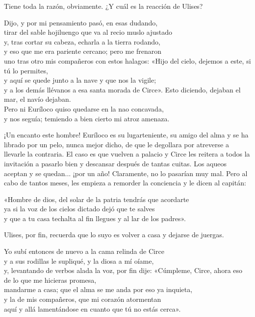 Tiene toda la razón, obviamente. ¿Y cuál es la reacción de Ulises?

\begin{versocita}
Dijo, y por mi pensamiento pasó, en esas dudando,\\
tirar del sable hojiluengo que va al recio muslo ajustado\\
y, tras cortar su cabeza, echarla a la tierra rodando,\\
y eso que me era pariente cercano; pero me frenaron\\
uno tras otro mis compañeros con estos halagos:
\stanzabreak
«Hijo del cielo, dejemos a este, si tú lo permites,\\
y aquí se quede junto a la nave y que nos la vigile;\\
y a los demás llévanos a esa santa morada de Circe».
\stanzabreak
Esto diciendo, dejaban el mar, el navío dejaban.\\
Pero ni Euríloco quiso quedarse en la nao concavada,\\
y nos seguía; temiendo a bien cierto mi atroz amenaza.
\end{versocita}

¡Un encanto este hombre! Euríloco es su lugarteniente, su amigo del alma y se ha librado por un pelo, nunca mejor dicho, de que le degollara por atreverse a llevarle la contraria. El caso es que vuelven a palacio y Circe les reitera a todos la invitación a pasarlo bien y descansar después de tantas cuitas. Los aqueos aceptan y se quedan... ¡por un año! Claramente, no lo pasarían muy mal. Pero al cabo de tantos meses, les empieza a remorder la conciencia y le dicen al capitán:

\begin{versocita}
«Hombre de dios, del solar de la patria tendrás que acordarte\\
ya si la voz de los cielos dictado dejó que te salves\\
y que a tu casa techalta al fin llegues y al lar de los padres».
\end{versocita}

Ulises, por fin, recuerda que lo suyo es volver a casa y dejarse de juergas.

\begin{versocita}
Yo subí entonces de nuevo a la cama relinda de Circe\\
y a sus rodillas le supliqué, y la diosa a mí oíame,\\
y, levantando de verbos alada la voz, por fin dije:
\stanzabreak
«Cúmpleme, Circe, ahora eso de lo que me hicieras promesa,\\
mandarme a casa; que el alma se me anda por eso ya inquieta,\\
y la de mis compañeros, que mi corazón atormentan\\
aquí y allá lamentándose en cuanto que tú no estás cerca».
\end{versocita}


